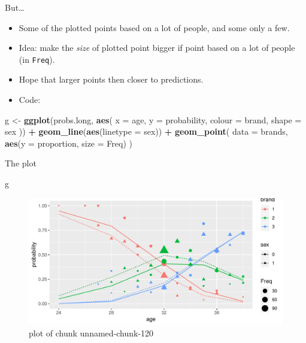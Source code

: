 \documentclass[ignorenonframetext,]{beamer}
\newenvironment{Shaded}{\begin{snugshade}}{\end{snugshade}}
\newcommand{\DataTypeTok}[1]{\textcolor[rgb]{0.13,0.29,0.53}{#1}}
\newcommand{\KeywordTok}[1]{\textcolor[rgb]{0.13,0.29,0.53}{\textbf{#1}}}
\newcommand{\NormalTok}[1]{#1}
\newcommand{\OperatorTok}[1]{\textcolor[rgb]{0.81,0.36,0.00}{\textbf{#1}}}
\newcommand{\StringTok}[1]{\textcolor[rgb]{0.31,0.60,0.02}{#1}}
\begin{document}
\begin{frame}[fragile]{But\ldots}
\protect\hypertarget{but-1}{}

\begin{itemize}
\item
  Some of the plotted points based on a lot of people, and some only a
  few.
\item
  Idea: make the \emph{size} of plotted point bigger if point based on a
  lot of people (in \texttt{Freq}).
\item
  Hope that larger points then closer to predictions.
\item
  Code:
\end{itemize}

\begin{Shaded}
\begin{Highlighting}[]
\NormalTok{g <-}\StringTok{ }\KeywordTok{ggplot}\NormalTok{(probs.long, }\KeywordTok{aes}\NormalTok{(}
  \DataTypeTok{x =}\NormalTok{ age, }\DataTypeTok{y =}\NormalTok{ probability,}
  \DataTypeTok{colour =}\NormalTok{ brand, }\DataTypeTok{shape =}\NormalTok{ sex}
\NormalTok{)) }\OperatorTok{+}
\StringTok{  }\KeywordTok{geom_line}\NormalTok{(}\KeywordTok{aes}\NormalTok{(}\DataTypeTok{linetype =}\NormalTok{ sex)) }\OperatorTok{+}
\StringTok{  }\KeywordTok{geom_point}\NormalTok{(}
    \DataTypeTok{data =}\NormalTok{ brands,}
    \KeywordTok{aes}\NormalTok{(}\DataTypeTok{y =}\NormalTok{ proportion, }\DataTypeTok{size =}\NormalTok{ Freq)}
\NormalTok{  )}
\end{Highlighting}
\end{Shaded}

\end{frame}

\begin{frame}[fragile]{The plot}
\protect\hypertarget{the-plot-3}{}

\begin{Shaded}
\begin{Highlighting}[]
\NormalTok{g}
\end{Highlighting}
\end{Shaded}

\begin{figure}
\centering
\includegraphics{figure/unnamed-chunk-120-1.pdf}
\caption{plot of chunk unnamed-chunk-120}
\end{figure}

\end{frame}
\end{document}
